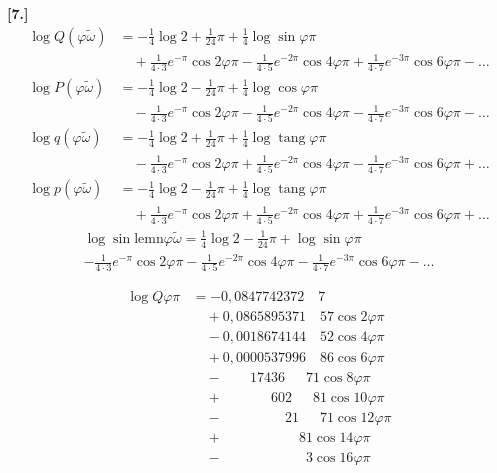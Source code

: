 \documentclass[10pt,a4paper]{article}
\newcommand{\lemn}{\text{lemn}}
\newcommand{\sinlemn}{\sin\lemn}
\DeclareMathOperator{\tg}{tang}
\begin{document}
\medskip
\noindent\textbf{[7.]}
\begin{align*}
\log Q(\varphi\tilde{\omega}) &= -\tfrac14\log 2 + \tfrac{1}{24}\pi + \tfrac{1}{4}\log\sin\varphi\pi\\
&\quad + \tfrac{1}{4\cdot3}e^{-\pi}\cos 2\varphi\pi - \tfrac{1}{4\cdot5}e^{-2\pi}\cos 4\varphi\pi + \tfrac{1}{4\cdot7}e^{-3\pi}\cos 6\varphi\pi - \ldots\\
\log P(\varphi\tilde{\omega}) &= -\tfrac14\log 2 - \tfrac{1}{24}\pi + \tfrac{1}{4}\log\cos\varphi\pi\\
&\quad - \tfrac{1}{4\cdot3}e^{-\pi}\cos 2\varphi\pi - \tfrac{1}{4\cdot5}e^{-2\pi}\cos 4\varphi\pi - \tfrac{1}{4\cdot7}e^{-3\pi}\cos 6\varphi\pi - \ldots\\
\log q(\varphi\tilde{\omega}) &= -\tfrac14\log 2 + \tfrac{1}{24}\pi + \tfrac{1}{4}\log\tg\varphi\pi\\
&\quad - \tfrac{1}{4\cdot3}e^{-\pi}\cos 2\varphi\pi + \tfrac{1}{4\cdot5}e^{-2\pi}\cos 4\varphi\pi - \tfrac{1}{4\cdot7}e^{-3\pi}\cos 6\varphi\pi + \ldots\\
\log p(\varphi\tilde{\omega}) &= -\tfrac14\log 2 - \tfrac{1}{24}\pi + \tfrac{1}{4}\log\tg\varphi\pi\\
&\quad + \tfrac{1}{4\cdot3}e^{-\pi}\cos 2\varphi\pi + \tfrac{1}{4\cdot5}e^{-2\pi}\cos 4\varphi\pi + \tfrac{1}{4\cdot7}e^{-3\pi}\cos 6\varphi\pi + \ldots
\end{align*}
\begin{multline*}
\log\sinlemn\varphi\tilde{\omega} = \tfrac14\log 2 - \tfrac{1}{24}\pi + \log\sin\varphi\pi\\
- \tfrac{1}{4\cdot3}e^{-\pi}\cos 2\varphi\pi - \tfrac{1}{4\cdot5}e^{-2\pi}\cos 4\varphi\pi - \tfrac{1}{4\cdot7}e^{-3\pi}\cos 6\varphi\pi - \ldots
\end{multline*}

\begin{align*}
\log Q\varphi\pi &= -0{,}0847742372\quad 7\\
&\quad + 0{,}0865895371\quad 57\cos 2\varphi\pi\\
&\quad - 0{,}0018674144\quad 52\cos 4\varphi\pi\\
&\quad + 0{,}0000537996\quad 86\cos 6\varphi\pi\\
&\quad - \phantom{0{,}00}17436\quad\phantom{0}71\cos 8\varphi\pi\\
&\quad + \phantom{0{,}00000}602\quad\phantom{0}81\cos 10\varphi\pi\\
&\quad - \phantom{0{,}0000000}21\quad\phantom{0}71\cos 12\varphi\pi\\
&\quad + \phantom{0{,}000000000}81\cos 14\varphi\pi\\
&\quad - \phantom{0{,}0000000000}3\cos 16\varphi\pi
\end{align*}
\end{document}
